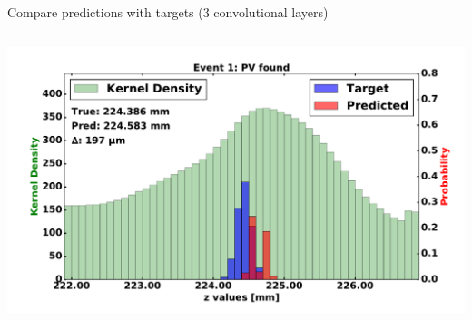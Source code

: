 \begin{frame}{Compare predictions with targets (3 convolutional layers)}
\begin{columns}[c]
\begin{center}
           \includegraphics[width=1\textwidth, height=0.45\textwidth, trim=18 0 18 0]{images/120000_3layer_11.pdf}
       \end{center}
  \end{columns}
\end{frame}
